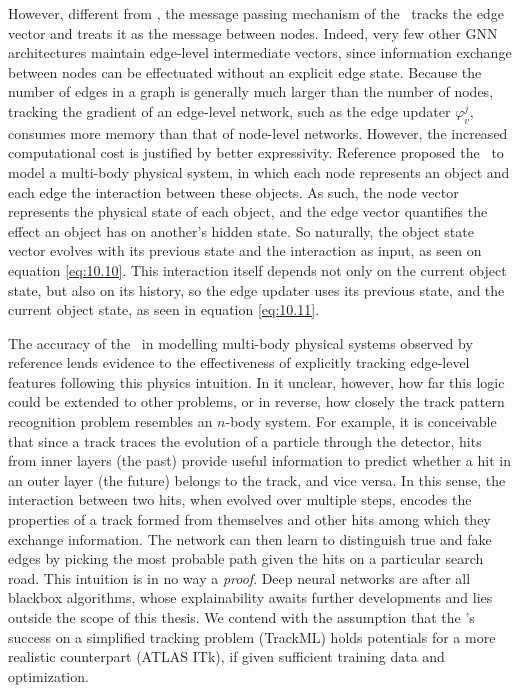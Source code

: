 However, different from \graphsage, the message passing mechanism of the \ignn~tracks the edge vector and treats it as the message between nodes.
Indeed, very few other GNN architectures maintain edge-level intermediate vectors, since information exchange between nodes can be effectuated without an explicit edge state. 
Because the number of edges in a graph is generally much larger than the number of nodes, tracking the gradient of an edge-level network, such as the edge updater $\varphi_v^j$, consumes more memory than that of node-level networks.
However, the increased computational cost is justified by better expressivity. 
Reference \cite{interaction-gnn} proposed the \ignn~to model a multi-body physical system, in which each node represents an object and each edge the interaction between these objects. 
As such, the node vector represents the physical state of each object, and the edge vector quantifies the effect an object has on another's hidden state. 
So naturally, the object state vector evolves with its previous state and the interaction as input, as seen on equation \eqref{eq:10.10}.
This interaction itself depends not only on the current object state, but also on its history, so the edge updater uses its previous state, and the current object state, as seen in equation \eqref{eq:10.11}.

The accuracy of the \ignn~in modelling multi-body physical systems observed by reference \cite{interaction-gnn} lends evidence to the effectiveness of explicitly tracking edge-level features following this physics intuition.
In it unclear, however, how far this logic could be extended to other problems, or in reverse, how closely the track pattern recognition problem resembles an $n$-body system. 
For example, it is conceivable that since a track traces the evolution of a particle through the detector, hits from inner layers (the past) provide useful information to predict whether a hit in an outer layer (the future) belongs to the track, and vice versa. 
In this sense, the interaction between two hits, when evolved over multiple steps, encodes the properties of a track formed from themselves and other hits among which they exchange information. 
The network can then learn to distinguish true and fake edges by picking the most probable path given the hits on a particular search road.
This intuition is in no way a \textit{proof}. 
Deep neural networks are after all blackbox algorithms, whose explainability awaits further developments and lies outside the scope of this thesis.
We contend with the assumption that the \ignn's success on a simplified tracking problem (TrackML) \cite{exatrkx} holds potentials for a more realistic counterpart (ATLAS ITk), if given sufficient training data and optimization. 

